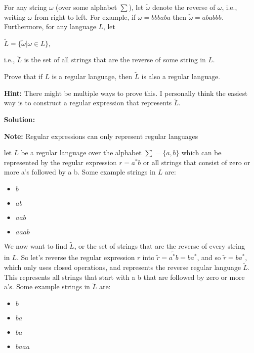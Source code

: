 \documentclass[11pt, letterpaper]{article}
\begin{document}
For any string $\omega$ (over some alphabet $\sum$), let $\tilde{\omega}$ denote the reverse of $\omega$, i.e., writing $\omega$ from right to left. For example, if $\omega = bbbaba$ then $\tilde{\omega} = ababbb$. Furthermore, for any language $L$, let

\vspace{5mm}

$\tilde{L} = \{\tilde{\omega}|\omega \in L\},$

\vspace{5mm}

\noindent i.e., $\tilde{L}$ is the set of all strings that are the reverse of some string in $L$.

\vspace{5mm}

\noindent Prove that if $L$ is a regular language, then $\tilde{L}$ is also a regular language.

\vspace{5mm}

\noindent \textbf{Hint:} There might be multiple ways to prove this. I personally think the easiest way is to construct a regular expression that represents $\tilde{L}$.

\vspace{5mm}

\noindent\textbf{Solution:}

\vspace{1mm}

\noindent \textbf{Note:} Regular expressions can only represent regular languages

\vspace{5mm}

\noindent let $L$ be a regular language over the alphabet $\sum = \{a, b\}$ which can be represented by the regular expression $r = a^*b$ or all strings that consist of zero or more a's followed by a b. Some example strings in $L$ are: 
\begin{itemize}
	\item $b$
	\item $ab$
	\item $aab$
	\item $aaab$
\end{itemize}

\noindent We now want to find $\tilde{L}$, or the set of strings that are the reverse of every string in $L$. So let's reverse the regular expression $r$ into $\tilde{r} = \tilde{a^*b} = ba^*$, and so $\tilde{r} = ba^*$, which only uses closed operations, and represents the reverse regular language $\tilde{L}$. This represents all strings that start with a b that are followed by zero or more a's. Some example strings in $\tilde{L}$ are:
\begin{itemize}
	\item $b$
	\item $ba$
	\item $ba$
	\item $baaa$
\end{itemize}
\end{document}
